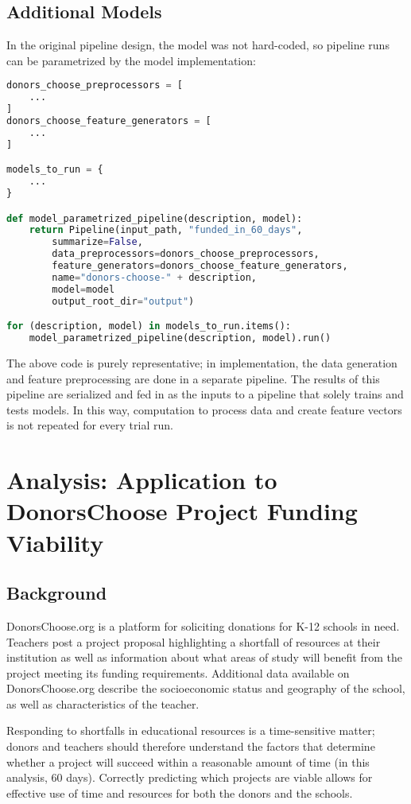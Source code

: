 \documentclass[11pt]{article}
\begin{document}
\subsection{Additional Models}
In the original pipeline design, the model was not hard-coded, so pipeline runs can be parametrized by the model implementation: 

\begin{lstlisting}[language=Python,numbers=none]
donors_choose_preprocessors = [
    ...
]
donors_choose_feature_generators = [
    ...
]

models_to_run = { 
    ...
}

def model_parametrized_pipeline(description, model):
    return Pipeline(input_path, "funded_in_60_days",
        summarize=False,
        data_preprocessors=donors_choose_preprocessors,
        feature_generators=donors_choose_feature_generators,
        name="donors-choose-" + description,
        model=model
        output_root_dir="output")

for (description, model) in models_to_run.items():
    model_parametrized_pipeline(description, model).run()
\end{lstlisting}

The above code is purely representative; in implementation, the data generation and feature preprocessing are done in a separate pipeline. The results of this pipeline are serialized and fed in as the inputs to a pipeline that solely trains and tests models. In this way, computation to process data and create feature vectors is not repeated for every trial run.


\section{Analysis: Application to DonorsChoose Project Funding Viability}

\subsection{Background}
DonorsChoose.org is a platform for soliciting donations for K-12 schools in need. Teachers post a project proposal highlighting a shortfall of resources at their institution as well as information about what areas of study will benefit from the project meeting its funding requirements. Additional data available on DonorsChoose.org describe the socioeconomic status and geography of the school, as well as characteristics of the teacher. 

Responding to shortfalls in educational resources is a time-sensitive matter; donors and teachers should therefore understand the factors that determine whether a project will succeed within a reasonable amount of time (in this analysis, 60 days). Correctly predicting which projects are viable allows for effective use of time and resources for both the donors and the schools. 
\end{document}

